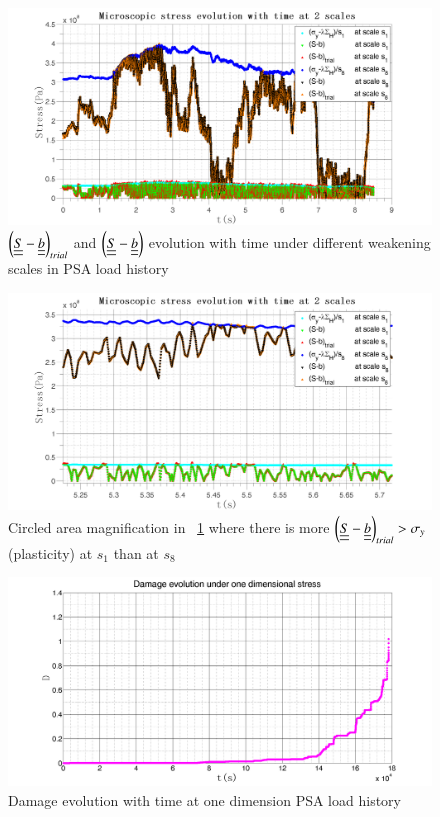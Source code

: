 \documentclass[3p,times,number,review]{elsarticle}
\newcommand{\figref}[1]{\figurename~\ref{#1}}
\begin{document}
\begin{figure}[!h]
	\centering
	\includegraphics[width=\textwidth]{figures//trialreal1d1.png} 
	\caption{$\left( \uline{\uline{S}}-\uline{\uline{b}}\right)_{trial}$ and $\left( \uline{\uline{S}}-\uline{\uline{b}}\right)$ evolution with time under different weakening scales in PSA load history}
	\label{trialreal}
\end{figure}
\begin{figure}[!h]
	\centering
	\includegraphics[width=\textwidth]{figures//trialreal1d2.png} 
	\caption{Circled area magnification in \figref{trialreal} where there is more $\left( \uline{\uline{S}}-\uline{\uline{b}}\right)_{trial}>\sigma_y$(plasticity)  at $s_1$ than at $s_8$}
	\label{trialreal1d2}
\end{figure}
\begin{figure}[!h]
	\centering
	\includegraphics[width=\textwidth]{figures//damage1d.png} 
	\caption{Damage evolution with time at one dimension PSA load history}
	\label{damage1d}
\end{figure}
\end{document}
